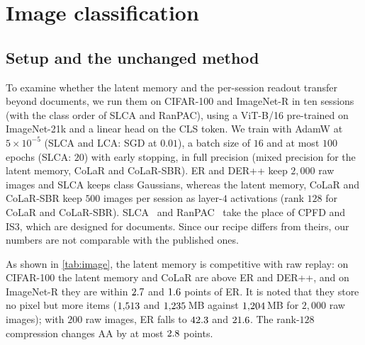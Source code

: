 \section{Image classification}
\label{app:image}

\subsection{Setup and the unchanged method}
\label{app:imgsetup}

\begin{table}[t]
\centering\small
\setlength{\tabcolsep}{3pt}
\caption{\textbf{Image class-incremental learning} with ViT-B/16 (mean $\pm$ s.d.\ of three runs; AF: mean). Kept across sessions: what a method stores (MB $=10^6$ bytes; ER: computed from its buffer, ours: recorded by the runs). $^{p}$Collapses under our shared recipe (AdamW at $5{\times}10^{-5}$, early stopping), far below its published results; we report it for completeness and did not tune it to our recipe. Bold: best of each column, Joint training aside; underlined: our best when a baseline is best.}
\label{tab:image}
\resizebox{0.8\linewidth}{!}{}
\end{table}

 To examine whether the latent memory and the per-session readout transfer beyond documents, we run them on CIFAR-100 and ImageNet-R in ten sessions (with the class order of SLCA and RanPAC), using a ViT-B/16 pre-trained on ImageNet-21k and a linear head on the CLS token. We train with AdamW at $5{\times}10^{-5}$ (SLCA and LCA: SGD at $0.01$), a batch size of $16$ and at most $100$ epochs (SLCA: $20$) with early stopping, in full precision (mixed precision for the latent memory, CoLaR and CoLaR-SBR). ER and DER++ keep $2{,}000$ raw images and SLCA keeps class Gaussians, whereas the latent memory, CoLaR and CoLaR-SBR keep $500$ images per session as layer-$4$ activations (rank $128$ for CoLaR and CoLaR-SBR). SLCA~\citep{zhang2023slca} and RanPAC~\citep{mcdonnell2023ranpac} take the place of CPFD and IS3, which are designed for documents. Since our recipe differs from theirs, our numbers are not comparable with the published ones.

 As shown in \cref{tab:image}, the latent memory is competitive with raw replay: on CIFAR-100 the latent memory and CoLaR are above ER and DER++, and on ImageNet-R they are within $2.7$ and $1.6$ points of ER. It is noted that they store no pixel but more items ($1{,}513$ and $1{,}235$\,MB against $1{,}204$\,MB for $2{,}000$ raw images); with $200$ raw images, ER falls to $42.3$ and $21.6$. The rank-$128$ compression changes AA by at most $2.8$ points.

